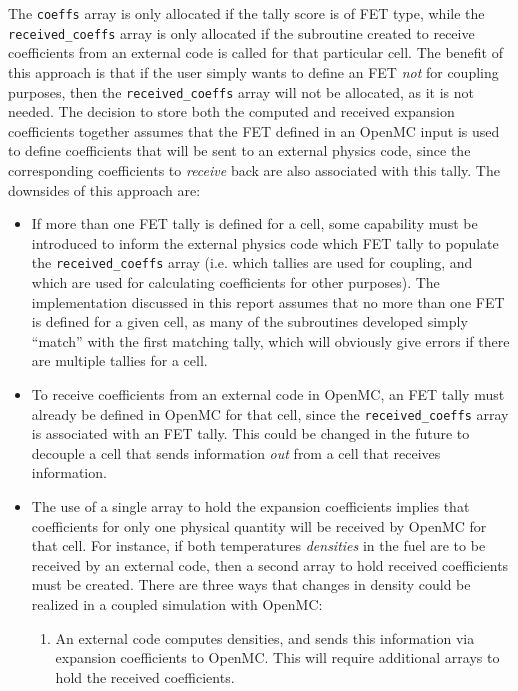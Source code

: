 \documentclass[10pt]{article}
\numberwithin{equation}{section} %
\begin{document}
The {\tt coeffs} array is only allocated if the tally score is of FET type, while the {\tt received\_coeffs} array is only allocated if the subroutine created to receive coefficients from an external code is called for that particular cell. The benefit of this approach is that if the user simply wants to define an FET {\it not} for coupling purposes, then the {\tt received\_coeffs} array will not be allocated, as it is not needed. The decision to store both the computed and received expansion coefficients together assumes that the FET defined in an OpenMC input is used to define coefficients that will be sent to an external physics code, since the corresponding coefficients to {\it receive} back are also associated with this tally. The downsides of this approach are:

\begin{itemize}
\color{magenta}
\item If more than one FET tally is defined for a cell, some capability must be introduced to inform the external physics code which FET tally to populate the {\tt received\_coeffs} array (i.e. which tallies are used for coupling, and which are used for calculating coefficients for other purposes). The implementation discussed in this report assumes that no more than one FET is defined for a given cell, as many of the subroutines developed simply ``match'' with the first matching tally, which will obviously give errors if there are multiple tallies for a cell.
\color{black}
\color{magenta}
\item To receive coefficients from an external code in OpenMC, an FET tally must already be defined in OpenMC for that cell, since the {\tt received\_coeffs} array is associated with an FET tally. This could be changed in the future to decouple a cell that sends information {\it out} from a cell that receives information.
\color{black}
\color{magenta}
\item The use of a single array to hold the expansion coefficients implies that coefficients for only one physical quantity will be received by OpenMC for that cell. For instance, if both temperatures {\it densities} in the fuel are to be received by an external code, then a second array to hold received coefficients must be created. \color{black}There are three ways that changes in density could be realized in a coupled simulation with OpenMC:
	\begin{enumerate}
	\item An external code computes densities, and sends this information via expansion coefficients to OpenMC. This will require additional arrays to hold the received coefficients.

\end{enumerate}
\end{itemize}
\end{document}
